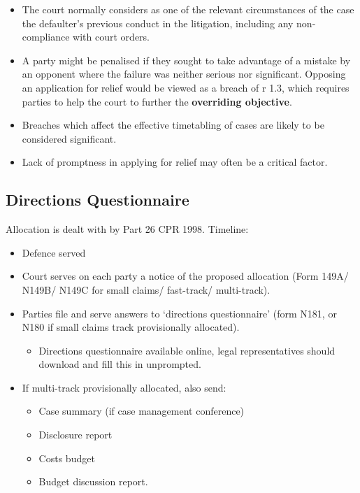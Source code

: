 \documentclass[
]{article}
\providecommand{\tightlist}{%
  \setlength{\itemsep}{0pt}\setlength{\parskip}{0pt}}
\begin{document}
\begin{itemize}
\tightlist
\item
  The court normally considers as one of the relevant circumstances of
  the case the defaulter's previous conduct in the litigation, including
  any non-compliance with court orders.
\item
  A party might be penalised if they sought to take advantage of a
  mistake by an opponent where the failure was neither serious nor
  significant. Opposing an application for relief would be viewed as a
  breach of r 1.3, which requires parties to help the court to further
  the \textbf{overriding objective}.
\item
  Breaches which affect the effective timetabling of cases are likely to
  be considered significant.
\item
  Lack of promptness in applying for relief may often be a critical
  factor.
\end{itemize}

\hypertarget{directions-questionnaire}{%
\subsection{Directions Questionnaire}\label{directions-questionnaire}}

Allocation is dealt with by Part 26 CPR 1998. Timeline:

\begin{itemize}
\tightlist
\item
  Defence served
\item
  Court serves on each party a notice of the proposed allocation (Form
  149A/ N149B/ N149C for small claims/ fast-track/ multi-track).
\item
  Parties file and serve answers to `directions questionnaire' (form
  N181, or N180 if small claims track provisionally allocated).

  \begin{itemize}
  \tightlist
  \item
    Directions questionnaire available online, legal representatives
    should download and fill this in unprompted.
  \end{itemize}
\item
  If multi-track provisionally allocated, also send:

  \begin{itemize}
  \tightlist
  \item
    Case summary (if case management conference)
  \item
    Disclosure report
  \item
    Costs budget
  \item
    Budget discussion report.
  \end{itemize}
\end{itemize}
\end{document}
